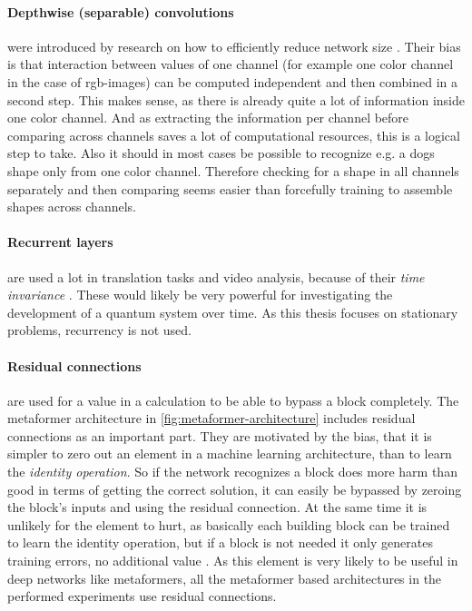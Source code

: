 \paragraph{Depthwise (separable) convolutions} were introduced by research on how to efficiently reduce network size \cite{mobileNetPaper}.
Their bias is that interaction between values of one channel (for example one color channel in the case of rgb-images) can be computed independent and then combined in a second step.
This makes sense, as there is already quite a lot of information inside one color channel. 
And as extracting the information per channel before comparing across channels saves a lot of computational resources, this is a logical step to take.
Also it should in most cases be possible to recognize e.g. a dogs shape only from one color channel. 
Therefore checking for a shape in all channels separately and then comparing seems easier than forcefully training to assemble shapes across channels.

\paragraph{Recurrent layers} are used a lot in translation tasks and video analysis, because of their \emph{time invariance} \cite{relationalInductiveBiasesAndGraphNetworks}. 
These would likely be very powerful for investigating the development of a quantum system over time. 
As this thesis focuses on stationary problems, recurrency is not used.

\paragraph{Residual connections} are used for a value in a calculation to be able to bypass a block completely.
The metaformer architecture in \autoref{fig:metaformer-architecture} includes residual connections as an important part.
They are motivated by the bias, that it is simpler to zero out an element in a machine learning architecture, than to learn the \emph{identity operation}. 
So if the network recognizes a block does more harm than good in terms of getting the correct solution, it can easily be bypassed by zeroing the block's inputs and using the residual connection. 
At the same time it is unlikely for the element to hurt, as basically each building block can be trained to learn the identity operation, but if a block is not needed it only generates training errors, no additional value \cite{deepResidualLearningForImageRecognition}.
As this element is very likely to be useful in deep networks like metaformers, all the metaformer based architectures in the performed experiments use residual connections.

